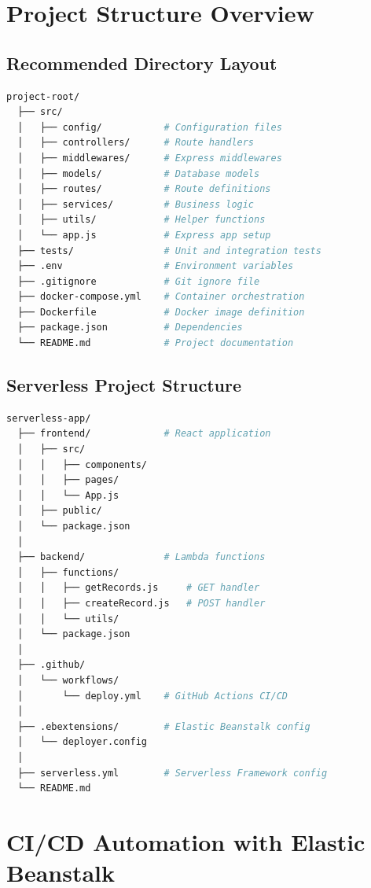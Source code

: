 \section{Project Structure Overview}

\subsection{Recommended Directory Layout}

\begin{lstlisting}[language=bash, caption=Backend Project Structure, captionpos=b]
project-root/
  ├── src/
  │   ├── config/           # Configuration files
  │   ├── controllers/      # Route handlers
  │   ├── middlewares/      # Express middlewares
  │   ├── models/           # Database models
  │   ├── routes/           # Route definitions
  │   ├── services/         # Business logic
  │   ├── utils/            # Helper functions
  │   └── app.js            # Express app setup
  ├── tests/                # Unit and integration tests
  ├── .env                  # Environment variables
  ├── .gitignore            # Git ignore file
  ├── docker-compose.yml    # Container orchestration
  ├── Dockerfile            # Docker image definition
  ├── package.json          # Dependencies
  └── README.md             # Project documentation
\end{lstlisting}

\subsection{Serverless Project Structure}

\begin{lstlisting}[language=bash, caption=AWS Serverless Application Structure, captionpos=b]
serverless-app/
  ├── frontend/             # React application
  │   ├── src/
  │   │   ├── components/
  │   │   ├── pages/
  │   │   └── App.js
  │   ├── public/
  │   └── package.json
  │
  ├── backend/              # Lambda functions
  │   ├── functions/
  │   │   ├── getRecords.js     # GET handler
  │   │   ├── createRecord.js   # POST handler
  │   │   └── utils/
  │   └── package.json
  │
  ├── .github/
  │   └── workflows/
  │       └── deploy.yml    # GitHub Actions CI/CD
  │
  ├── .ebextensions/        # Elastic Beanstalk config
  │   └── deployer.config
  │
  ├── serverless.yml        # Serverless Framework config
  └── README.md
\end{lstlisting}

\section{CI/CD Automation with Elastic Beanstalk}

